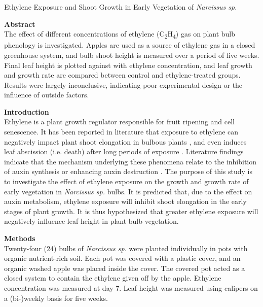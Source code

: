 \documentclass{report}
\begin{document}
\begin{center}
  \LARGE
  Ethylene Exposure and Shoot Growth in Early Vegetation of \textit{Narcissus sp.}
\end{center}

\medskip

\begin{multicols}{3}

  \textbf{Abstract}\\
  The effect of different concentrations of ethylene (C\textsubscript{2}H\textsubscript{4}) gas on plant bulb phenology is investigated.
  Apples are used as a source of ethylene gas in a closed greenhouse system, and bulb shoot height is measured over a period of five weeks.
  Final leaf height is plotted against with ethylene concentration, and leaf growth and growth rate are compared between control and ethylene-treated groups.
  Results were largely inconclusive, indicating poor experimental design or the influence of outside factors.
  
  \textbf{Introduction}\\
  Ethylene is a plant growth regulator responsible for fruit ripening and cell senescence.
  It has been reported in literature that exposure to ethylene can negatively impact plant shoot elongation in bulbous plants \parencite{bulbous}, and even induces leaf abscission (i.e. death) after long periods of exposure \parencite{abscission}.
  Literature findings indicate that the mechanism underlying these phenomena relate to the inhibition of auxin synthesis or enhancing auxin destruction \parencite{senescence}.
  The purpose of this study is to investigate the effect of ethylene exposure on the growth and growth rate of early vegetation in \textit{Narcissus sp.} bulbs.
  It is predicted that, due to the effect on auxin metabolism, ethylene exposure will inhibit shoot elongation in the early stages of plant growth.
  It is thus hypothesized that greater ethylene exposure will negatively influence leaf height in plant bulb vegetation.

  \vfill\null
  \columnbreak
  
  \textbf{Methods}\\
  Twenty-four (24) bulbs of \textit{Narcissus sp.} were planted individually in pots with organic nutrient-rich soil.
  Each pot was covered with a plastic cover, and an organic washed apple was placed inside the cover.
  The covered pot acted as a closed system to contain the ethylene given off by the apple.
  Ethylene concentration was measured at day 7.
  Leaf height was measured using calipers on a (bi-)weekly basis for five weeks.


\end{multicols}
\end{document}

